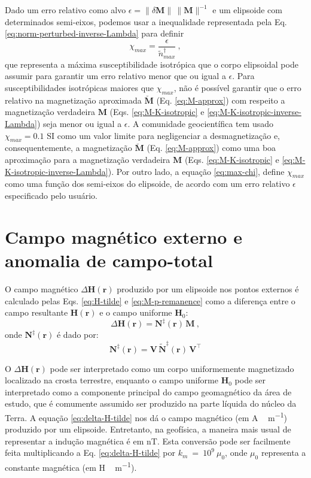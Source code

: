 Dado um erro relativo como alvo
$\epsilon = \| \delta \mathbf{M} \| \, \| \mathbf{M} \|^{-1}$
e um elipsoide com determinados semi-eixos, podemos usar a inequalidade representada pela 
Eq. \ref{eq:norm-perturbed-inverse-Lambda}
para definir
\begin{equation}
\chi_{max} = \frac{\epsilon}{\tilde{n}^{\dagger}_{max}} \: ,
\label{eq:max-chi}
\end{equation}
que representa a máxima susceptibilidade isotrópica que o corpo elipsoidal
pode assumir para garantir um erro relativo menor que ou igual a $\epsilon$.
Para susceptibilidades isotrópicas maiores que $\chi_{max}$,
não é possível garantir que o erro relativo na magnetização aproximada
$\breve{\mathbf{M}}$ (Eq. \ref{eq:M-approx}) com respeito a magnetização verdadeira
$\mathbf{M}$ (Eqs. \ref{eq:M-K-isotropic} e \ref{eq:M-K-isotropic-inverse-Lambda})
seja menor ou igual a $\epsilon$. A comunidade geocientífica tem usado $\chi_{max} = 0.1$ SI
como um valor limite para negligenciar a desmagnetização e, consequentemente, a magnetização
$\breve{\mathbf{M}}$ (Eq. \ref{eq:M-approx}) como uma boa aproximação para a magnetização
verdadeira $\mathbf{M}$ (Eqs. \ref{eq:M-K-isotropic} e \ref{eq:M-K-isotropic-inverse-Lambda}).
Por outro lado, a equação \ref{eq:max-chi}, define $\chi_{max}$ como uma função dos semi-eixos do elipsoide,
de acordo com um erro relativo $\epsilon$ especificado pelo usuário.

\section{Campo magnético externo e anomalia de campo-total}

O campo magnético $\Delta {\mathbf{H}}({\mathbf{r}})$ produzido por um elipsoide nos pontos externos é calculado pelas Eqs. \ref{eq:H-tilde} e \ref{eq:M-p-remanence} como a diferença entre o campo resultante ${\mathbf{H}}({\mathbf{r}})$ 
e o campo uniforme ${\mathbf{H}}_{0}$:
\begin{equation}
\Delta {\mathbf{H}}({\mathbf{r}}) = 
{\mathbf{N}}^{\ddagger}({\mathbf{r}}) \, {\mathbf{M}} \: ,
\label{eq:delta-H}
\end{equation}
onde ${\mathbf{N}}^{\ddagger}({\mathbf{r}})$ é dado por:
\begin{equation}
{\mathbf{N}}^{\ddagger}({\mathbf{r}}) = 
\mathbf{V} \, \tilde{{\mathbf{N}}}^{\ddagger}({\mathbf{r}}) \, \mathbf{V}^{\top}
\label{eq:n-p}
\end{equation}

O $\Delta {\mathbf{H}}({\mathbf{r}})$ pode ser interpretado como um corpo uniformemente magnetizado localizado na crosta terrestre, enquanto o campo uniforme ${\mathbf{H}}_{0}$ pode ser interpretado como a componente principal do campo geomagnético da área de estudo, que é comumente assumido ser produzido na parte líquida do núcleo da Terra. A equação \ref{eq:delta-H-tilde} nos dá o campo magnético (em \unit{A \, m^{-1}}) produzido por um elipsoide. Entretanto, na geofísica, a maneira mais usual de representar a indução magnética é  em  \unit{nT}. Esta conversão pode ser facilmente feita multiplicando a Eq. \ref{eq:delta-H-tilde} por $k_{m}~=~10^{9}~\mu_{0}$, onde $\mu_{0}$ representa a constante magnética (em \unit{H \, m^{-1}}).

